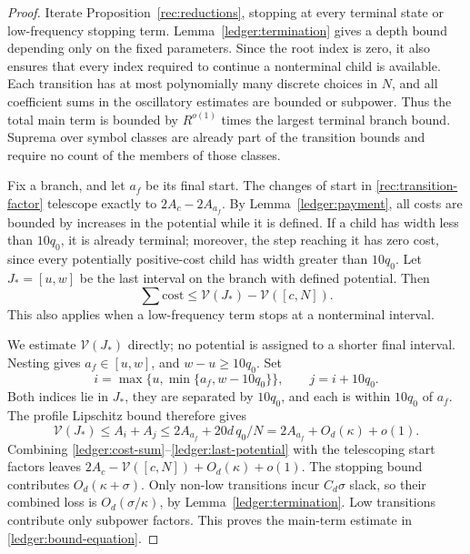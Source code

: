 \begin{proof}
Iterate Proposition~\ref{rec:reductions}, stopping at every terminal
state or low-frequency stopping term.  Lemma~\ref{ledger:termination}
gives a depth bound depending only on the fixed parameters.  Since the
root index is zero, it also ensures that every index required to continue
a nonterminal child is available.
Each transition has at most polynomially many discrete choices
in \(N\), and all coefficient sums in the oscillatory estimates
are bounded or subpower.  Thus the total main term is bounded by
\(R^{o(1)}\) times the largest terminal branch bound.  Suprema
over symbol classes are already part of the transition bounds
and require no count of the members of those classes.

Fix a branch, and let \(a_f\) be its final start.  The changes
of start in \eqref{rec:transition-factor} telescope exactly to
\(2A_c-2A_{a_f}\).  By Lemma~\ref{ledger:payment}, all costs
are bounded by increases in the potential while it is defined.
If a child has width less than \(10q_0\), it is already terminal;
moreover, the step reaching it has zero cost, since every
potentially positive-cost child has width greater than
\(10q_0\).  Let \(J_*=[u,w]\) be the last interval on the
branch with defined potential.  Then
\begin{equation}\label{ledger:cost-sum}
 \sum\mathrm{cost}
 \le\mathcal V(J_*)-\mathcal V([c,N]).
\end{equation}
This also applies when a low-frequency term stops at a
nonterminal interval.

We estimate \(\mathcal V(J_*)\) directly; no potential is assigned
to a shorter final interval.  Nesting gives \(a_f\in[u,w]\), and
\(w-u\ge10q_0\).  Set
\[
 i=\max\{u,\min\{a_f,w-10q_0\}\},\qquad j=i+10q_0.
\]
Both indices lie in \(J_*\), they are separated by \(10q_0\),
and each is within \(10q_0\) of \(a_f\).  The profile Lipschitz
bound therefore gives
\begin{equation}\label{ledger:last-potential}
 \mathcal V(J_*)\le A_i+A_j
 \le2A_{a_f}+20d\,q_0/N
 =2A_{a_f}+O_d(\kappa)+o(1).
\end{equation}
Combining \eqref{ledger:cost-sum}--\eqref{ledger:last-potential}
with the telescoping start factors leaves
\(2A_c-\mathcal V([c,N])+O_d(\kappa)+o(1)\).
The stopping bound contributes \(O_d(\kappa+\sigma)\).
Only non-low transitions incur \(C_d\sigma\) slack, so their
combined loss is \(O_d(\sigma/\kappa)\), by
Lemma~\ref{ledger:termination}.  Low transitions contribute only
subpower factors.  This proves the main-term estimate in
\eqref{ledger:bound-equation}.


\end{proof}
